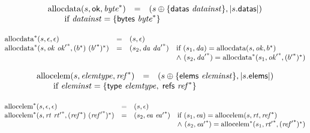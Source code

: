 $$
\begin{array}[t]{@{}lcl@{}l@{}}
{\mathrm{allocdata}}(s, \mathsf{ok}, {{\mathit{byte}}^\ast}) & = & (s \oplus \{ \mathsf{datas}~{\mathit{datainst}} \}, {|s{.}\mathsf{datas}|}) &  \\
 \multicolumn{4}{@{}l@{}}{\quad
\quad \mbox{if}~ {\mathit{datainst}} = \{ \mathsf{bytes}~{{\mathit{byte}}^\ast} \}
} \\
\end{array}
$$

$$
\begin{array}[t]{@{}lcl@{}l@{}}
{{{\mathrm{allocdata}}^\ast}}{(s, \epsilon, \epsilon)} & = & (s, \epsilon) \\
{{{\mathrm{allocdata}}^\ast}}{(s, {\mathit{ok}}~{{\mathit{ok}'}^\ast}, ({b^\ast})~{({{b'}^\ast})^\ast})} & = & (s_2, {\mathit{da}}~{{\mathit{da}'}^\ast}) & \quad
\begin{array}[t]{@{}l@{}}
\mbox{if}~ (s_1, {\mathit{da}}) = {\mathrm{allocdata}}(s, {\mathit{ok}}, {b^\ast}) \\
{\land}~ (s_2, {{\mathit{da}'}^\ast}) = {{{\mathrm{allocdata}}^\ast}}{(s_1, {{\mathit{ok}'}^\ast}, {({{b'}^\ast})^\ast})} \\
\end{array} \\
\end{array}
$$

$$
\begin{array}[t]{@{}lcl@{}l@{}}
{\mathrm{allocelem}}(s, {\mathit{elemtype}}, {{\mathit{ref}}^\ast}) & = & (s \oplus \{ \mathsf{elems}~{\mathit{eleminst}} \}, {|s{.}\mathsf{elems}|}) &  \\
 \multicolumn{4}{@{}l@{}}{\quad
\quad \mbox{if}~ {\mathit{eleminst}} = \{ \mathsf{type}~{\mathit{elemtype}},\;\allowbreak \mathsf{refs}~{{\mathit{ref}}^\ast} \}
} \\
\end{array}
$$

$$
\begin{array}[t]{@{}lcl@{}l@{}}
{{{\mathrm{allocelem}}^\ast}}{(s, \epsilon, \epsilon)} & = & (s, \epsilon) \\
{{{\mathrm{allocelem}}^\ast}}{(s, {\mathit{rt}}~{{\mathit{rt}'}^\ast}, ({{\mathit{ref}}^\ast})~{({{\mathit{ref}'}^\ast})^\ast})} & = & (s_2, {\mathit{ea}}~{{\mathit{ea}'}^\ast}) & \quad
\begin{array}[t]{@{}l@{}}
\mbox{if}~ (s_1, {\mathit{ea}}) = {\mathrm{allocelem}}(s, {\mathit{rt}}, {{\mathit{ref}}^\ast}) \\
{\land}~ (s_2, {{\mathit{ea}'}^\ast}) = {{{\mathrm{allocelem}}^\ast}}{(s_1, {{\mathit{rt}'}^\ast}, {({{\mathit{ref}'}^\ast})^\ast})} \\
\end{array} \\
\end{array}
$$


